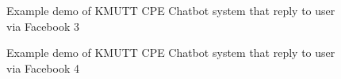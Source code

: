 \documentclass[12pt,oneside,openright,a4paper]{cpe-english-project}
\begin{document}
\begin{figure}[!h]\centering
{}
\caption{Example demo of KMUTT CPE Chatbot system that reply to user via Facebook 3}\label{fig:Example demo of KMUTT CPE Chatbot system that reply to user via Facebook 3}
\end{figure}
\begin{figure}[!h]\centering
{}
\caption{Example demo of KMUTT CPE Chatbot system that reply to user via Facebook 4}\label{fig:Example demo of KMUTT CPE Chatbot system that reply to user via Facebook 4}
\end{figure}
\end{document}
